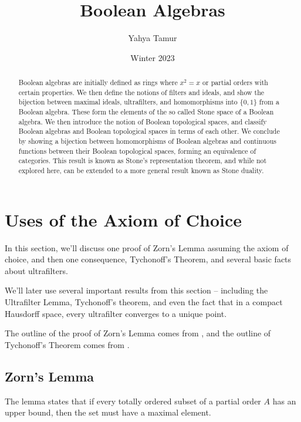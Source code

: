 \documentclass{article}
\title{Boolean Algebras}
\author{Yahya Tamur}
\date{Winter 2023}
\begin{document}
  \maketitle


  \begin{abstract}

    Boolean algebras are initially defined as rings where $x^2 = x$ or partial
    orders with certain properties. We then define the notions of filters and
    ideals, and show the bijection between maximal ideals, ultrafilters, and
    homomorphisms into $\{0,1\}$ from a Boolean algebra. These form the elements
    of the so called Stone space of a Boolean algebra. We then introduce the
    notion of Boolean topological spaces, and classify Boolean algebras and
    Boolean topological spaces in terms of each other. We conclude by showing a
    bijection between homomorphisms of Boolean algebras and continuous functions
    between their Boolean topological spaces, forming an equivalence of
    categories. This result is known as Stone's representation theorem, and
    while not explored here, can be extended to a more general result known as
    Stone duality.

  \end{abstract}

    \section{Uses of the Axiom of Choice}

      In this section, we'll discuss one proof of Zorn's Lemma assuming the
      axiom of choice, and then one consequence, Tychonoff's Theorem, and
      several basic facts about ultrafilters.

      We'll later use several important results from this section -- including
      the Ultrafilter Lemma, Tychonoff's theorem, and even the fact that in a
      compact Hausdorff space, every ultrafilter converges to a unique point.

      The outline of the proof of Zorn's Lemma comes from \cite{zorn}, and the
      outline of Tychonoff's Theorem comes from \cite{tych}.

      \subsection{Zorn's Lemma}

        The lemma states that if every totally ordered subset of a partial order
        $A$ has an upper bound, then the set must have a maximal element.
\end{document}

